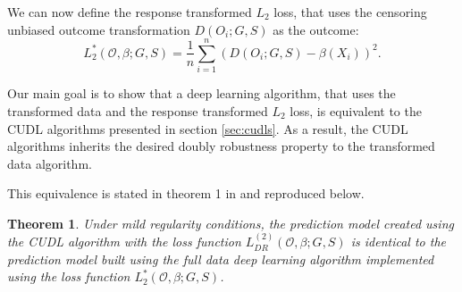 \documentclass[12pt, a4paper]{article}
\theoremstyle{definition}
\theoremstyle{plain}
\newtheorem{Theorem}{Theorem}[section]
\numberwithin{equation}{section}
\numberwithin{figure}{section}
\numberwithin{table}{section}
\begin{document}
	We can now define the response transformed $L_2$ loss, that uses the censoring unbiased outcome transformation $D(O_i;G,S)$ as the outcome:
	\begin{equation*}
	L_2^*(\mathcal{O}, \beta; G,S) = \frac{1}{n} \sum_{i=1}^n (D(O_i;G,S)-\beta(X_i))^2.
	\end{equation*}
	
	Our main goal is to show that a deep learning algorithm, that uses the transformed data and the response transformed $L_2$ loss, is equivalent to the CUDL algorithms presented in section \ref{sec:cudls}.
	As a result, the CUDL algorithms inherits the desired doubly robustness property to the transformed data algorithm.
	
	This equivalence is stated in theorem 1 in \citet*{basearticle} and reproduced below.
	
	\begin{Theorem}\label{thm:equi}
		Under mild regularity conditions, the prediction model created using the CUDL algorithm with the loss function $L_{DR}^{(2)}(\mathcal{O}, \beta; G,S)$ is identical to the prediction model built using the full data deep learning algorithm implemented using the loss function $L_2^*(\mathcal{O}, \beta; G,S)$.
	\end{Theorem}
	
\end{document}
